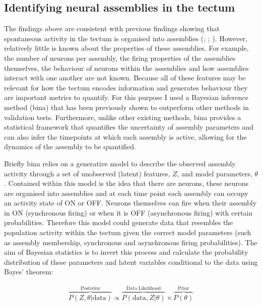 \subsection{Identifying neural assemblies in the tectum}
The findings above are consistent with previous findings showing that spontaneous activity in the tectum is organised into assemblies (\cite{Romano2015}; \cite{Avitan2017}; \cite{Pietri2017}). However, relatively little is known about the properties of these assemblies. For example, the number of neurons per assembly, the firing properties of the assemblies themselves, the behaviour of neurons within the assemblies and how assemblies interact with one another are not known. Because all of these features may be relevant for how the tectum encodes information and generates behaviour they are important metrics to quantify. For this purpose I used a Bayesian inference method (\gls{bina}) that has been previously shown to outperform other methods in validation tests. Furthermore, unlike other existing methods, \gls{bina} provides a statistical framework that quantifies the uncertainty of assembly parameters and can also infer the timepoints at which each assembly is active, allowing for the dynamics of the assembly to be quantified. 

Briefly \gls{bina} relies on a generative model to  describe the observed assembly activity through a set of unobserved (latent) features, $Z$, and model parameters, $\theta$. Contained within this model is the idea that there are neurons, these neurons are organised into assemblies and at each time point each assembly can occupy an activity state of ON or OFF. Neurons themselves can fire when their assembly in ON (synchronous firing) or when it is OFF (asynchronous firing) with certain probabilities. Therefore this model could generate data that resembles the population activity within the tectum given the correct model parameters (such as assembly membership, synchronous and asynchronous firing probabilities). The aim of Bayesian statistics is to invert this process and calculate the probability distribution of these parameters and latent variables conditional to the data using Bayes' theorem: 

\begin{align}
    \overset{\mathrm{Posterior}}{\overbrace{P(Z,\theta|\mathrm{data})}} \propto \overset{\mathrm{Data\;Likelihood}}{\overbrace{P(\mathrm{data},Z|\theta)}}\times \overset{\mathrm{Prior}}{\overbrace{P(\theta)}}
    \label{eq:bayes_theorem}
\end{align}

